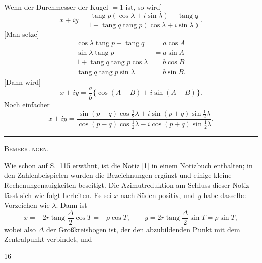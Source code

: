 Wenn der Durchmesser der Kugel $=1$ ist, so wird]
\[
x+iy=\frac{\operatorname{tang}p(\cos\lambda+i\sin\lambda)-\operatorname{tang}q}{1+\operatorname{tang}q\operatorname{tang}p(\cos\lambda+i\sin\lambda)}.
\]
[Man setze]
\[
\begin{aligned}
\cos\lambda\operatorname{tang}p-\operatorname{tang}q&=a\cos A\\
\sin\lambda\operatorname{tang}p&=a\sin A\\
1+\operatorname{tang}q\operatorname{tang}p\cos\lambda&=b\cos B\\
\operatorname{tang}q\operatorname{tang}p\sin\lambda&=b\sin B.
\end{aligned}
\]
[Dann wird]
\[
x+iy=\frac ab\{\cos(A-B)+i\sin(A-B)\}.
\]
Noch einfacher
\[
x+iy=\frac{\sin(p-q)\cos\frac12\lambda+i\sin(p+q)\sin\frac12\lambda}{\cos(p-q)\cos\frac12\lambda-i\cos(p+q)\sin\frac12\lambda}.
\]
\begin{center}\rule{.18\textwidth}{.4pt}\par\vspace{10mm}\textsc{Bemerkungen.}\end{center}
\begingroup\small
Wie schon auf S.~115 erwähnt, ist die Notiz [1] in einem Notizbuch enthalten; in den Zahlenbeispielen wurden die Bezeichnungen ergänzt und einige kleine Rechenungenauigkeiten beseitigt. Die Azimutreduktion am Schluss dieser Notiz lässt sich wie folgt herleiten. Es sei $x$ nach Süden positiv, und $y$ habe dasselbe Vorzeichen wie $\lambda$. Dann ist
\[
x=-2r\operatorname{tang}\frac\Delta2\cos T=-\rho\cos T,\qquad y=2r\operatorname{tang}\frac\Delta2\sin T=\rho\sin T,
\]
wobei also $\Delta$ der Großkreisbogen ist, der den abzubildenden Punkt mit dem Zentralpunkt verbindet, und
\par\endgroup
\vfill{}\hfill16\hspace*{2cm}\par
\endgroup
